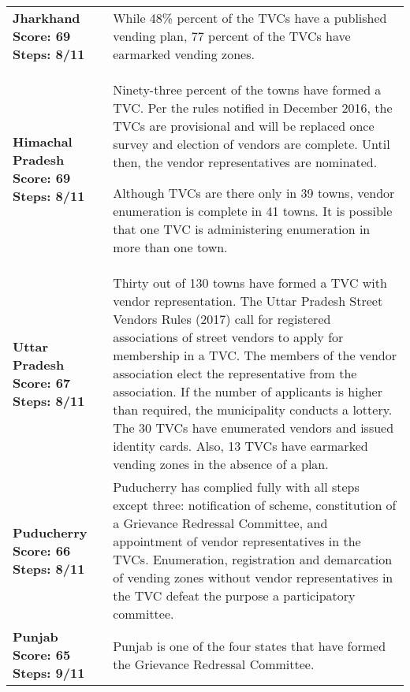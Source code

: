 \documentclass[a4paper, 12pt, twoside]{article}
\begin{document}
\begin{longtable}[l]{>{\raggedright}p{4cm}>{\raggedright\arraybackslash}p{10cm}}
\\
\midrule
\multicolumn{2}{l}{States with Good Compliance (Index score Between 50 to 70)}\\
\midrule
\cellcolor{SVACgreen3}\bf{Jharkhand}
\newline
\bf{Score: 69}
\newline
\bf{Steps: 8/11}
&
\cellcolor{SVACgreen2}While 48\% percent of the TVCs have a published vending plan, 77 percent of the TVCs have earmarked vending zones. 
\\
\cellcolor{SVACgreen3}\bf{Himachal Pradesh}
\newline
\bf{Score: 69}
\newline
\bf{Steps: 8/11}
& 
\cellcolor{SVACgreen2}Ninety-three percent of the towns have formed a TVC. Per the rules notified in December 2016, the TVCs are provisional and will be replaced once survey and election of vendors are complete. Until then, the vendor representatives are nominated.

Although TVCs are there only in 39 towns, vendor enumeration is complete in 41 towns. It is possible that one TVC is administering enumeration in more than one town.
\\
\cellcolor{SVACgreen3}\bf{Uttar Pradesh}
\newline
\bf{Score: 67}
\newline
\bf{Steps: 8/11}
& 
\cellcolor{SVACgreen2}Thirty out of 130 towns have formed a TVC with vendor representation. The Uttar Pradesh Street Vendors Rules (2017) call for registered associations of street vendors to apply for membership in a TVC. The members of the vendor association elect the representative from the association. If the number of applicants is higher than required, the municipality conducts a lottery. The 30 TVCs have enumerated vendors and issued identity cards. Also, 13 TVCs have earmarked vending zones in the absence of a plan.
\\
\cellcolor{SVACgreen3}\bf{Puducherry}
\newline
\bf{Score: 66}
\newline
\bf{Steps: 8/11}
&
\cellcolor{SVACgreen2}Puducherry has complied fully with all steps except three: notification of scheme, constitution of a Grievance Redressal Committee, and appointment of vendor representatives in the TVCs. Enumeration, registration and demarcation of vending zones without vendor representatives in the TVC defeat the purpose a participatory committee.
\\
\cellcolor{SVACgreen3}\bf{Punjab}
\newline
\bf{Score: 65}
\newline
\bf{Steps: 9/11}
&
\cellcolor{SVACgreen2}Punjab is one of the four states that have formed the Grievance Redressal Committee.


\end{longtable}
\end{document}
